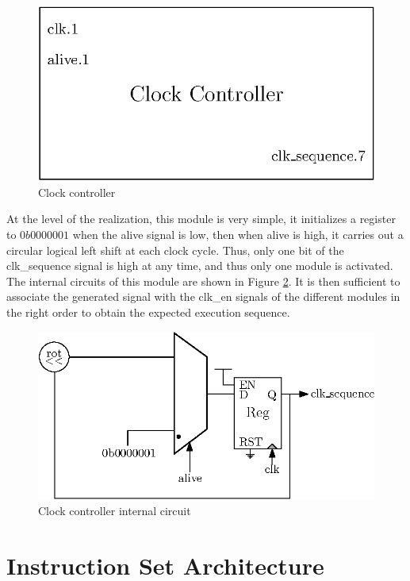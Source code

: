 \begin{figure}[H]
    \centering
    \includegraphics[scale=0.8]{Chapter3-CPU/res/clock_controller}
    \caption{Clock controller}
    \label{fig:components/cc}
\end{figure}

At the level of the realization, this module is very simple, it initializes a register to 
$0b0000001$ when the alive signal is low, then when alive is high, it carries out a circular logical 
left shift at each clock cycle. Thus, only one bit of the clk\_sequence signal is high at any time, 
and thus only one module is activated. The internal circuits of this module are shown in Figure 
\ref{fig:components/cc_in}. It is then sufficient to associate the generated signal with the clk\_en 
signals of the different modules in the right order to obtain the expected execution sequence.

\begin{figure}[H]
    \centering
    \includegraphics[scale=1.0]{Chapter3-CPU/res/clock_controller_in}
    \caption{Clock controller internal circuit}
    \label{fig:components/cc_in}
\end{figure}


\section{Instruction Set Architecture}
